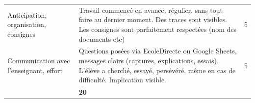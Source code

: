 \documentclass{exam}
\begin{document}
{\begin{longtable}{|L{0.22\textwidth}|L{0.62\textwidth}|c|}
 \\
\hline

Anticipation, organisation, consignes
& Travail commencé en avance, régulier, sans tout faire au dernier moment. Des traces sont visibles. Les consignes sont parfaitement respectées (nom des documents etc)
& 5 \\
\hline

Communication avec l’enseignant, effort
& Questions posées via EcoleDirecte ou Google Sheets, messages clairs (captures, explications, essais). L’élève a cherché, essayé, persévéré, même en cas de difficulté. Implication visible.
& 5 \\
\hline

 & \textbf{20} \\
\hline

\end{longtable}
}
\end{document}
